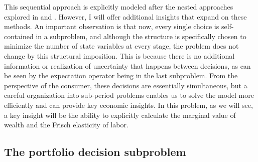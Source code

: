 \documentclass{article}
\newcommand{\DiscFac}{\beta}
\newcommand{\util}{u}
\newcommand{\tShkEmp}{\theta}
\newcommand{\Ex}{\mathbb{E}}
\newcommand{\CRRA}{\rho}
\newcommand{\h}{h}
\newcommand{\bRat}{b}
\newcommand{\leisure}{z}
\newcommand{\cRat}{c}
\newcommand{\vFunc}{\mathrm{v}}
\newcommand{\Rfree}{\mathsf{R}}
\newcommand{\PGro}{\Gamma}
\newcommand{\labor}{\ell}
\newcommand{\aRat}{a}
\newcommand{\mRat}{m}
\newcommand{\vOpt}{\tilde{\mathfrak{v}}}
\begin{document}
This sequential approach is explicitly modeled after the nested approaches explored in \citet{Clausen2020} and \citet{Druedahl2021}. However, I will offer additional insights that expand on these methods. An important observation is that now, every single choice is self-contained in a subproblem, and although the structure is specifically chosen to minimize the number of state variables at every stage, the problem does not change by this structural imposition. This is because there is no additional information or realization of uncertainty that happens between decisions, as can be seen by the expectation operator being in the last subproblem. From the perspective of the consumer, these decisions are essentially simultaneous, but a careful organization into sub-period problems enables us to solve the model more efficiently and can provide key economic insights. In this problem, as we will see, a key insight will be the ability to explicitly calculate the marginal value of wealth and the Frisch elasticity of labor.

%

\subsection{The portfolio decision subproblem}\label{The portfolio decision subproblem}
\end{document}
